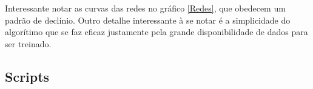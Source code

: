 \documentclass[
	article,			%
	11pt,				%
	oneside,			%
	a4paper,			%
	openany,
	english,			%
	brazil,				%
	sumario=tradicional
	]{abntex2}
\begin{document}
Interessante notar as curvas das redes no gráfico \ref{Redes}, que
obedecem um padrão de declínio. Outro detalhe interessante à se notar
é a simplicidade do algorítimo que se faz eficaz justamente pela grande
disponibilidade de dados para ser treinado.


\begin{apendicesenv}

\chapter{Scripts}

\end{apendicesenv}
\end{document}
